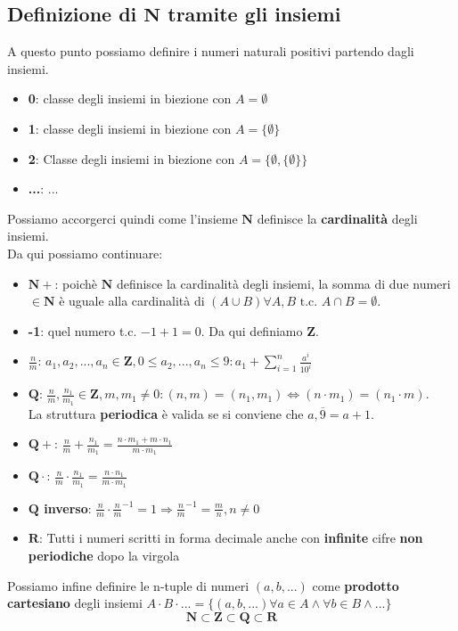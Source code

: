 \documentclass{report}
\begin{document}
    \subsection{Definizione di $\mathbf{N}$ tramite gli insiemi}
    A questo punto possiamo definire i numeri naturali positivi partendo dagli insiemi.
    \begin{itemize}
        \item \textbf{0}: classe degli insiemi in biezione con $A = \emptyset$
        \item \textbf{1}: classe degli insiemi in biezione con $A = \{\emptyset\}$
        \item \textbf{2}: Classe degli insiemi in biezione con $A = \{\emptyset, \{\emptyset\}\}$
        \item \textbf{...}: ...
    \end{itemize}
    Possiamo accorgerci quindi come l'insieme $\mathbf{N}$ definisce la \textbf{cardinalità}
    degli insiemi. \\
    Da qui possiamo continuare:
    \begin{itemize}
        \item \textbf{$\mathbf{N} +$}: poichè $\mathbf{N}$ definisce la cardinalità degli insiemi,
            la somma di due numeri $\in \mathbf{N}$ è uguale alla cardinalità di 
            $(A \cup B) \forall A, B \textrm{ t.c. } A \cap B = \emptyset$.
        \item \textbf{-1}: quel numero t.c. $-1 + 1 = 0$. Da qui definiamo $\mathbf{Z}$.
        \item \textbf{$\frac{n}{m}$}: 
            $a_1, a_2, ..., a_n \in \mathbf{Z}, 0 \leq a_2, ..., a_n \leq 9:
            a_1 + \sum_{i=1}^{n}\frac{a^i}{10^i}$
        \item \textbf{$\mathbf{Q}$}: 
            ${\frac{n}{m},\frac{n_1}{m_1} \in \mathbf{Z}, m, m_1 \neq 0: 
            (n, m) = (n_1, m_1) \Longleftrightarrow (n \cdot m_1) = (n_1 \cdot m)}$. \\
            La struttura \textbf{periodica} è valida se si conviene che 
            $a,\overline{9} = a + 1$.
        \item \textbf{$\mathbf{Q} +$}: 
            $\frac{n}{m} + \frac{n_1}{m_1} = \frac{n \cdot m_1 + m \cdot n_1}{m \cdot m_1}$
        \item \textbf{$\mathbf{Q} \cdot$}:
            $\frac{n}{m} \cdot \frac{n_1}{m_1} = \frac{n \cdot n_1}{m \cdot m_1}$
        \item \textbf{$\mathbf{Q}$ inverso}: 
            $\frac{n}{m} \cdot \frac{n}{m}^{-1} = 1 \Longrightarrow 
            \frac{n}{m}^{-1} = \frac{m}{n}, n \neq 0$
        \item \textbf{$\mathbf{R}$}: {Tutti i numeri scritti in forma decimale
            anche con \textbf{infinite} cifre \textbf{non periodiche} dopo la virgola}
    \end{itemize}
    Possiamo infine definire le n-tuple di numeri $\left(a, b, ...\right)$ come
    \textbf{prodotto cartesiano} degli insiemi $A \cdot B \cdot ... = \{(a, b, ...) 
    \forall a \in A \wedge \forall b \in B \wedge ...\}$
    $$\mathbf{N} \subset \mathbf{Z} \subset \mathbf{Q} \subset \mathbf{R}$$
\end{document}
